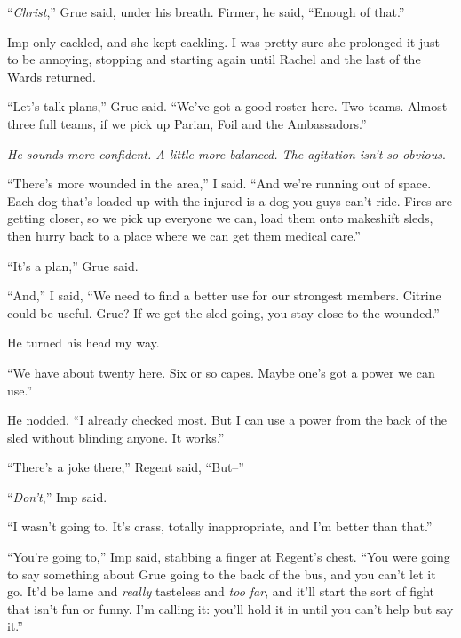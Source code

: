 ``\emph{Christ},'' Grue said, under his breath.  Firmer, he said, ``Enough of that.''



Imp only cackled, and she kept cackling.  I was pretty sure she prolonged it just to be annoying, stopping and starting again until Rachel and the last of the Wards returned.



``Let's talk plans,'' Grue said.  ``We've got a good roster here.  Two teams.  Almost three full teams, if we pick up Parian, Foil and the Ambassadors.''



\emph{He sounds more confident.  A little more balanced.  The agitation isn't so obvious}.



``There's more wounded in the area,'' I said.  ``And we're running out of space.  Each dog that's loaded up with the injured is a dog you guys can't ride.  Fires are getting closer, so we pick up everyone we can, load them onto makeshift sleds, then hurry back to a place where we can get them medical care.''



``It's a plan,'' Grue said.



``And,'' I said, ``We need to find a better use for our strongest members.  Citrine could be useful.  Grue?  If we get the sled going, you stay close to the wounded.''



He turned his head my way.



``We have about twenty here.  Six or so capes.  Maybe one's got a power we can use.''



He nodded.  ``I already checked most.  But I can use a power from the back of the sled without blinding anyone.  It works.''



``There's a joke there,'' Regent said, ``But--''



``\emph{Don't},'' Imp said.



``I wasn't going to.  It's crass, totally inappropriate, and I'm better than that.''



``You're going to,'' Imp said, stabbing a finger at Regent's chest.  ``You were going to say something about Grue going to the back of the bus, and you can't let it go.  It'd be lame and \emph{really} tasteless and \emph{too far}, and it'll start the sort of fight that isn't fun or funny.  I'm calling it: you'll hold it in until you can't help but say it.''



